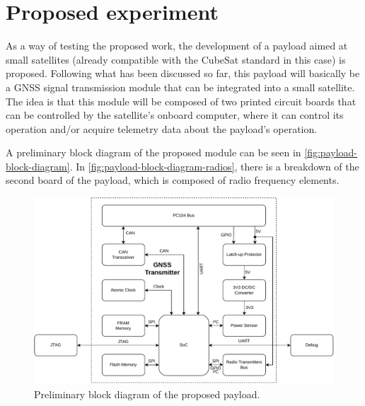\section{Proposed experiment}


As a way of testing the proposed work, the development of a payload aimed at small satellites (already compatible with the CubeSat standard in this case) is proposed. Following what has been discussed so far, this payload will basically be a GNSS signal transmission module that can be integrated into a small satellite. The idea is that this module will be composed of two printed circuit boards that can be controlled by the satellite's onboard computer, where it can control its operation and/or acquire telemetry data about the payload's operation.


A preliminary block diagram of the proposed module can be seen in \autoref{fig:payload-block-diagram}. In \autoref{fig:payload-block-diagram-radios}, there is a breakdown of the second board of the payload, which is composed of radio frequency elements.

\begin{figure}[!ht]
    \begin{center}
        \includegraphics[width=\columnwidth]{figures/block-diagram}
        \caption{Preliminary block diagram of the proposed payload.}
        \label{fig:payload-block-diagram}
    \end{center}
\end{figure}


